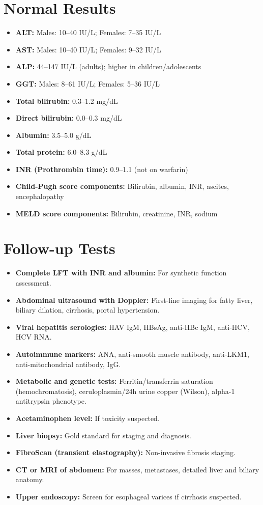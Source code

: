 \section*{Normal Results}
\begin{itemize}
  \item \textbf{ALT:} Males: 10--40 IU/L; Females: 7--35 IU/L
  \item \textbf{AST:} Males: 10--40 IU/L; Females: 9--32 IU/L
  \item \textbf{ALP:} 44--147 IU/L (adults); higher in children/adolescents
  \item \textbf{GGT:} Males: 8--61 IU/L; Females: 5--36 IU/L
  \item \textbf{Total bilirubin:} 0.3--1.2 mg/dL
  \item \textbf{Direct bilirubin:} 0.0--0.3 mg/dL
  \item \textbf{Albumin:} 3.5--5.0 g/dL
  \item \textbf{Total protein:} 6.0--8.3 g/dL
  \item \textbf{INR (Prothrombin time):} 0.9--1.1 (not on warfarin)
  \item \textbf{Child-Pugh score components:} Bilirubin, albumin, INR, ascites, encephalopathy
  \item \textbf{MELD score components:} Bilirubin, creatinine, INR, sodium
\end{itemize}

\section*{Follow-up Tests}
\begin{itemize}
  \item \textbf{Complete LFT with INR and albumin:} For synthetic function assessment.
  \item \textbf{Abdominal ultrasound with Doppler:} First-line imaging for fatty liver, biliary dilation, cirrhosis, portal hypertension.
  \item \textbf{Viral hepatitis serologies:} HAV IgM, HBsAg, anti-HBc IgM, anti-HCV, HCV RNA.
  \item \textbf{Autoimmune markers:} ANA, anti-smooth muscle antibody, anti-LKM1, anti-mitochondrial antibody, IgG.
  \item \textbf{Metabolic and genetic tests:} Ferritin/transferrin saturation (hemochromatosis), ceruloplasmin/24h urine copper (Wilson), alpha-1 antitrypsin phenotype.
  \item \textbf{Acetaminophen level:} If toxicity suspected.
  \item \textbf{Liver biopsy:} Gold standard for staging and diagnosis.
  \item \textbf{FibroScan (transient elastography):} Non-invasive fibrosis staging.
  \item \textbf{CT or MRI of abdomen:} For masses, metastases, detailed liver and biliary anatomy.
  \item \textbf{Upper endoscopy:} Screen for esophageal varices if cirrhosis suspected.
\end{itemize}

